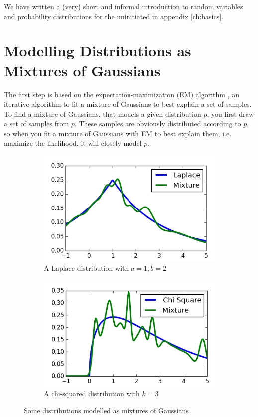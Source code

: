 \documentclass[11pt,a4paper]{book}
\begin{document}
We have written a (very) short and informal introduction to random variables and
probability distributions for the uninitiated in appendix \ref{ch:basics}.

\section{Modelling Distributions as Mixtures of Gaussians}
\label{sec:em}

The first step is based on the expectation-maximization (EM) algorithm
\cite[chapter~11.4.2]{murphy}, an iterative algorithm to fit a mixture of
Gaussians to best explain a set of samples. To find a mixture of Gaussians, that
models a given distribution $p$, you first draw a set of samples from $p$. These
samples are obviously distributed according to $p$, so when you fit a mixture of
Gaussians with EM to best explain them, i.e. maximize the likelihood, it will
closely model $p$.

\begin{figure}[h]
  \centering
  \begin{subfigure}{0.45\textwidth}
    \centering
    \includegraphics[width=\textwidth]{thesis/theory/em-laplace}
    \caption{A Laplace distribution with $a = 1, b = 2$}
  \end{subfigure}
  \hfill
  \begin{subfigure}{0.45\textwidth}
    \centering
    \includegraphics[width=\textwidth]{thesis/theory/em-chisq}
    \caption{A chi-squared distribution with $k = 3$}
  \end{subfigure}
  \caption{Some distributions modelled as mixtures of Gaussians}
  \label{fig:theory-em}
\end{figure}
\end{document}
